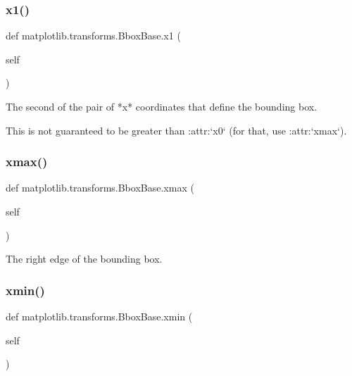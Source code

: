 \subsubsection{\texorpdfstring{x1()}{x1()}}
{\footnotesize\ttfamily def matplotlib.\+transforms.\+Bbox\+Base.\+x1 (\begin{DoxyParamCaption}\item[{}]{self }\end{DoxyParamCaption})}

\begin{DoxyVerb}The second of the pair of *x* coordinates that define the bounding box.

This is not guaranteed to be greater than :attr:`x0` (for that, use
:attr:`xmax`).
\end{DoxyVerb}
 \mbox{\label{classmatplotlib_1_1transforms_1_1BboxBase_a7045e130a04a0a9b7388dc51a9e6bff7}} 
\subsubsection{\texorpdfstring{xmax()}{xmax()}}
{\footnotesize\ttfamily def matplotlib.\+transforms.\+Bbox\+Base.\+xmax (\begin{DoxyParamCaption}\item[{}]{self }\end{DoxyParamCaption})}

\begin{DoxyVerb}The right edge of the bounding box.\end{DoxyVerb}
 \mbox{\label{classmatplotlib_1_1transforms_1_1BboxBase_a97453798574dd9b3a2bac353969c71a9}} 
\subsubsection{\texorpdfstring{xmin()}{xmin()}}
{\footnotesize\ttfamily def matplotlib.\+transforms.\+Bbox\+Base.\+xmin (\begin{DoxyParamCaption}\item[{}]{self }\end{DoxyParamCaption})}

